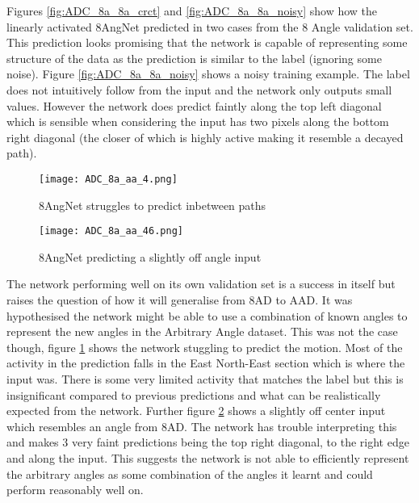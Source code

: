 Figures \ref{fig:ADC_8a_8a_crct} and \ref{fig:ADC_8a_8a_noisy} show how the linearly activated 8AngNet predicted in two cases from the 8 Angle validation set.
This prediction looks promising that the network is capable of representing some structure of the data as the prediction is similar to the label (ignoring some noise).
Figure \ref{fig:ADC_8a_8a_noisy} shows a noisy training example.
The label does not intuitively follow from the input and the network only outputs small values.
However the network does predict faintly along the top left diagonal which is sensible when considering the input has two pixels along the bottom right diagonal (the closer of which is highly active making it resemble a decayed path). 

\begin{figure}
    \centering
    \texttt{[image: ADC\_8a\_aa\_4.png]}
    \caption{8AngNet struggles to predict inbetween paths}
    \label{fig:ADC_8aNoaa}
\end{figure}

\begin{figure}
    \centering
    \texttt{[image: ADC\_8a\_aa\_46.png]}
    \caption{8AngNet predicting a slightly off angle input}
    \label{fig:ADC_8aNoaa_fork}
\end{figure}

The network performing well on its own validation set is a success in itself but raises the question of how it will generalise from 8AD to AAD.
It was hypothesised the network might be able to use a combination of known angles to represent the new angles in the Arbitrary Angle dataset.
This was not the case though, figure \ref{fig:ADC_8aNoaa} shows the network stuggling to predict the motion.
Most of the activity in the prediction falls in the East North-East section which is where the input was.
There is some very limited activity that matches the label but this is insignificant compared to previous predictions and what can be realistically expected from the network. 
Further figure \ref{fig:ADC_8aNoaa_fork} shows a slightly off center input which resembles an angle from 8AD. 
The network has trouble interpreting this and makes 3 very faint predictions being the top right diagonal, to the right edge and along the input.
This suggests the network is not able to efficiently represent the arbitrary angles as some combination of the angles it learnt and could perform reasonably well on.

